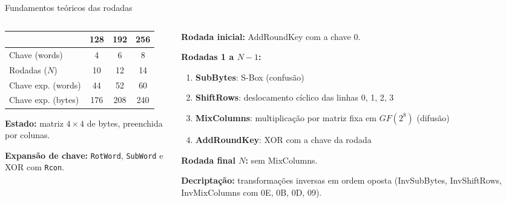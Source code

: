 \documentclass[aspectratio=169,11pt]{beamer}
\begin{document}
\begin{frame}{Fundamentos teóricos das rodadas}
  \begin{columns}[T]
    \begin{column}{0.5\textwidth}
      \small
      \begin{tabular}{lccc}
        \toprule
        & \textbf{128} & \textbf{192} & \textbf{256}\\
        \midrule
        Chave (words)  & 4  & 6  & 8 \\
        Rodadas ($N$)  & 10 & 12 & 14\\
        Chave exp. (words) & 44 & 52 & 60\\
        Chave exp. (bytes) & 176 & 208 & 240\\
        \bottomrule
      \end{tabular}

      \vspace{0.6em}
      \textbf{Estado:} matriz $4\times4$ de bytes, preenchida por colunas.

      \textbf{Expansão de chave:} \texttt{RotWord}, \texttt{SubWord} e XOR com \texttt{Rcon}.
    \end{column}
    \begin{column}{0.5\textwidth}
      \small
      \textbf{Rodada inicial:} AddRoundKey com a chave 0.

      \textbf{Rodadas 1 a $N-1$:}
      \begin{enumerate}
        \item \textbf{SubBytes}: S-Box (confusão)
        \item \textbf{ShiftRows}: deslocamento cíclico das linhas 0, 1, 2, 3
        \item \textbf{MixColumns}: multiplicação por matriz fixa em $GF(2^8)$ (difusão)
        \item \textbf{AddRoundKey}: XOR com a chave da rodada
      \end{enumerate}
      \textbf{Rodada final $N$:} sem MixColumns.

      \textbf{Decriptação:} transformações inversas em ordem oposta
      (InvSubBytes, InvShiftRows, InvMixColumns com 0E, 0B, 0D, 09).
    \end{column}
  \end{columns}
\end{frame}
\end{document}
